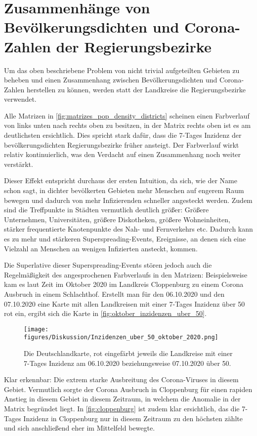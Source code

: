 \section{Zusammenhänge von Bevölkerungsdichten und Corona-Zahlen der Regierungsbezirke}
Um das oben beschriebene Problem von nicht trivial aufgeteilten Gebieten zu beheben und einen Zusammenhang zwischen Bevölkerungsdichten und Corona-Zahlen herstellen zu können, werden statt der Landkreise die Regierungsbezirke verwendet.

Alle Matrizen in \autoref{fig:matrizes_pop_density_districts} scheinen einen Farbverlauf von links unten nach rechts oben zu besitzen, in der Matrix rechts oben ist es am deutlichsten ersichtlich. Dies spricht stark dafür, dass die 7-Tages Inzidenz der bevölkerungsdichten Regierungsbezirke früher ansteigt. Der Farbverlauf wirkt relativ kontinuierlich, was den Verdacht auf einen Zusammenhang noch weiter verstärkt.

Dieser Effekt entspricht durchaus der ersten Intuition, da sich, wie der Name schon sagt, in dichter bevölkerten Gebieten mehr Menschen auf engerem Raum bewegen und dadurch von mehr Infizierenden schneller angesteckt werden.
Zudem sind die Treffpunkte in Städten vermutlich deutlich größer: Größere Unternehmen, Universitäten, größere Diskotheken, größere Wohneinheiten, stärker frequentierte Knotenpunkte des Nah- und Fernverkehrs etc. Dadurch kann es zu mehr und stärkeren Superspreading-Events, Ereignisse, an denen sich eine Vielzahl an Menschen an wenigen Infizierten ansteckt, kommen.

Die Superlative dieser Superspreading-Events stören jedoch auch die Regelmäßigkeit des angesprochenen Farbverlaufs in den Matrizen: Beispielsweise kam es laut Zeit \autocite{} im Oktober 2020 im Landkreis Cloppenburg zu einem Corona Ausbruch in einem Schlachthof. Erstellt man für den 06.10.2020 und den 07.10.2020 eine Karte mit allen Landkreisen mit einer 7-Tages Inzidenz über 50 rot ein, ergibt sich die Karte in \autoref{fig:oktober_inzidenzen_uber_50}. 

\begin{figure}
    \centering
    \texttt{[image: figures/Diskussion/Inzidenzen\_uber\_50\_oktober\_2020.png]}
    \caption{Die Deutschlandkarte, rot eingefärbt jeweils die Landkreise mit einer 7-Tages Inzidenz am 06.10.2020 beziehungsweise 07.10.2020 über 50.}
    \label{fig:oktober_inzidenzen_uber_50}
\end{figure}
Klar erkennbar: Die extrem starke Ausbreitung des Corona-Viruses in diesem Gebiet. Vermutlich sorgte der Corona Ausbruch in Cloppenburg für einen rapiden Anstieg in diesem Gebiet in diesem Zeitraum, in welchem die Anomalie in der Matrix begründet liegt. In \autoref{fig:cloppenburg} ist zudem klar ersichtlich, das die 7-Tages Inzidenz in Cloppenburg nur in diesem Zeitraum zu den höchsten zählte und sich anschließend eher im Mittelfeld bewegte.

